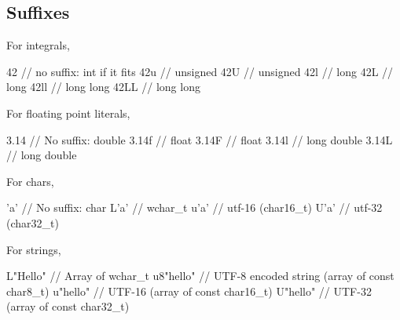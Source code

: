 \documentclass{report}
\begin{document}
\subsection{Suffixes}
\bigbreak \noindent 
For integrals,
\begin{cppcode}
42 // no suffix: int if it fits
42u // unsigned
42U // unsigned
42l // long
42L // long
42ll // long long
42LL // long long
\end{cppcode}
\bigbreak \noindent 
For floating point literals,
\bigbreak \noindent 
\begin{cppcode}
3.14 // No suffix: double
3.14f // float
3.14F // float
3.14l // long double
3.14L // long double
\end{cppcode}
\bigbreak \noindent 
For chars,
\bigbreak \noindent 
\begin{cppcode}
'a' // No suffix: char
L'a' // wchar_t
u'a' // utf-16 (char16_t)
U'a' // utf-32 (char32_t)
\end{cppcode}
\bigbreak \noindent 
For strings,
\bigbreak \noindent 
\begin{cppcode}
L"Hello" // Array of wchar_t
u8"hello" // UTF-8 encoded string (array of const char8_t)
u"hello" // UTF-16 (array of const char16_t)
U"hello" // UTF-32 (array of const char32_t)
\end{cppcode}
\end{document}
